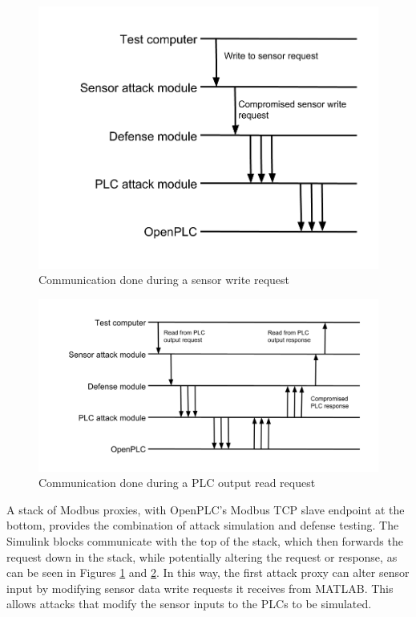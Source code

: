 \documentclass[10pt,twocolumn]{IEEEtran}
\begin{document}
\begin{figure}
  \centering
  \includegraphics[width=\columnwidth]{csaw2017sensorwrite.png}
  \caption{Communication done during a sensor write request}
  \label{fig:write}
\end{figure}

\begin{figure}
  \centering
  \includegraphics[width=\textwidth]{csaw2017plcread.png}
  \caption{Communication done during a PLC output read request}
  \label{fig:read}
\end{figure}


A stack of Modbus proxies, with OpenPLC's Modbus TCP slave endpoint at the bottom, provides the combination of attack simulation and defense testing.
The Simulink blocks communicate with the top of the stack, which then forwards the request down in the stack, while potentially altering the request or response, as can be seen in Figures \ref{fig:write} and \ref{fig:read}.
In this way, the first attack proxy can alter sensor input by modifying sensor data write requests it receives from MATLAB.
This allows attacks that modify the sensor inputs to the PLCs to be simulated.
\end{document}
